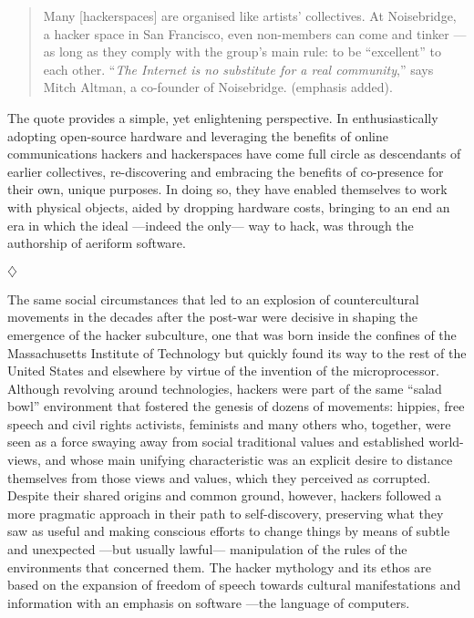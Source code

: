 \begin{quote}
Many [hackerspaces] are organised like artists’ collectives. At Noisebridge, a hacker space in San Francisco, even non-members can come and tinker ---as long as they comply with the group’s main rule: to be “excellent” to each other. ``\emph{The Internet is no substitute for a real community},'' says Mitch Altman, a co-founder of Noisebridge. (emphasis added).
\end{quote}

The quote provides a simple, yet enlightening perspective. In enthusiastically adopting open-source hardware and leveraging the benefits of online communications hackers and hackerspaces have come full circle as descendants of earlier collectives, re-discovering and embracing the benefits of co-presence for their own, unique purposes. In doing so, they have enabled themselves to work with physical objects, aided by dropping hardware costs, bringing to an end an era in which the ideal ---indeed the only--- way to hack, was through the authorship of aeriform software.




\vspace{30pt}
\centerline{$\diamondsuit$}
\vspace{30pt}




The same social circumstances that led to an explosion of countercultural movements in the decades after the post-war were decisive in shaping the emergence of the hacker subculture, one that was born inside the confines of the Massachusetts Institute of Technology but quickly found its way to the rest of the United States and elsewhere by virtue of the invention of the microprocessor. Although revolving around technologies, hackers were part of the same ``salad bowl'' environment that fostered the genesis of dozens of movements: hippies, free speech and civil rights activists, feminists and many others who, together, were seen as a force swaying away from social traditional values and established world-views, and whose main unifying characteristic was an explicit desire to distance themselves from those views and values, which they perceived as corrupted. Despite their shared origins and common ground, however, hackers followed a more pragmatic approach in their path to self-discovery, preserving what they saw as useful and making conscious efforts to change things by means of subtle and unexpected ---but usually lawful--- manipulation of the rules of the environments that concerned them. The hacker mythology and its ethos are based on the expansion of freedom of speech towards cultural manifestations and information with an emphasis on software ---the language of computers.

